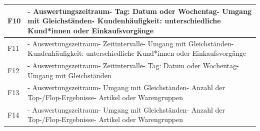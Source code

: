\documentclass[a4paper,10pt]{article}
\begin{document}
\begin{longtable}{>{\raggedright\arraybackslash}p{}>{\raggedright\arraybackslash}p{}}
            \midrule
            F10                 & - Auswertungszeitraum\newline - Tag: Datum oder Wochentag\newline - Umgang mit Gleichständen\newline - Kundenhäufigkeit: unterschiedliche Kund*innen oder Einkaufsvorgänge \\
            \midrule
            F11                 & - Auswertungszeitraum\newline - Zeitintervalle\newline - Umgang mit Gleichständen\newline - Kundenhäufigkeit: unterschiedliche Kund*innen oder Einkaufsvorgänge            \\
            \midrule
            F12                 & - Auswertungszeitraum\newline - Zeitintervalle\newline - Tag: Datum oder Wochentag\newline - Umgang mit Gleichständen                                                      \\
            \midrule
            F13                 & - Auswertungszeitraum\newline - Umgang mit Gleichständen\newline - Anzahl der Top-/Flop-Ergebnisse\newline - Artikel oder Warengruppen                                     \\
            \midrule
            F14                 & - Auswertungszeitraum\newline - Umgang mit Gleichständen\newline - Anzahl der Top-/Flop-Ergebnisse\newline - Artikel oder Warengruppen                                     \\
        \end{longtable}
        \clearpage
\end{document}
